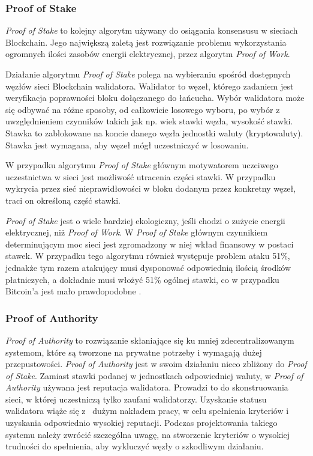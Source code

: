 \documentclass[a4paper,12pt]{book}
\begin{document}
\subsubsection{Proof of Stake}

\textit{Proof of Stake} to kolejny algorytm używany do osiągania konsensusu w sieciach Blockchain. Jego największą zaletą jest rozwiązanie problemu wykorzystania ogromnych ilości zasobów energii elektrycznej, przez algorytm \textit{Proof of Work}.

Działanie algorytmu \textit{Proof of Stake} polega na wybieraniu spośród dostępnych węzłów sieci Blockchain walidatora. Walidator to węzeł, którego zadaniem jest weryfikacja poprawności bloku dołączanego do łańcucha. Wybór walidatora może się odbywać na różne sposoby, od całkowicie losowego wyboru, po wybór z uwzględnieniem czynników takich jak np. wiek stawki węzła, wysokość stawki. Stawka to zablokowane na koncie danego węzła jednostki waluty (kryptowaluty). Stawka jest wymagana, aby węzeł mógł uczestniczyć w losowaniu.

W przypadku algorytmu \textit{Proof of Stake} głównym motywatorem uczciwego uczestnictwa w sieci jest możliwość utracenia części stawki. W przypadku wykrycia przez sieć nieprawidłowości w bloku dodanym przez konkretny węzeł, traci on określoną część stawki.

\textit{Proof of Stake} jest o wiele bardziej ekologiczny, jeśli chodzi o zużycie energii elektrycznej, niż \textit{Proof of Work}. W \textit{Proof of Stake} głównym czynnikiem determinującym moc sieci jest zgromadzony w niej wkład finansowy w postaci stawek. W przypadku tego algorytmu również występuje problem ataku 51\%, jednakże tym razem atakujący musi dysponować odpowiednią ilością środków płatniczych, a dokładnie musi włożyć 51\% ogólnej stawki, co w przypadku Bitcoin'a jest mało prawdopodobne \cite{abpos}.

\subsubsection{Proof of Authority}
\textit{Proof of Authority} to rozwiązanie skłaniające się ku mniej zdecentralizowanym systemom, które są tworzone na prywatne potrzeby i wymagają dużej przepustowości. \textit{Proof of Authority} jest w swoim działaniu nieco zbliżony do \textit{Proof of Stake}. Zamiast stawki podanej w jednostkach odpowiedniej waluty, w \textit{Proof of Authority} używana jest reputacja walidatora. Prowadzi to do skonstruowania sieci, w której uczestniczą tylko zaufani walidatorzy. Uzyskanie statusu walidatora wiąże się z~ dużym nakładem pracy, w celu spełnienia kryteriów i uzyskania odpowiednio wysokiej reputacji. Podczas projektowania takiego systemu należy zwrócić szczególna uwagę, na stworzenie kryteriów o wysokiej trudności do spełnienia, aby wykluczyć węzły o szkodliwym działaniu.
\end{document}
